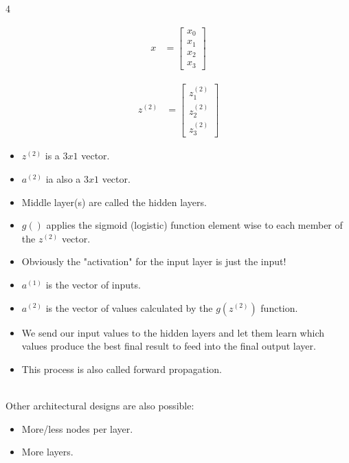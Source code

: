 \documentclass{article}
\begin{document}
\begin{multicols}{4}

  \begin{align*}
    x & = \begin{bmatrix}
      x_{0} \\
      x_{1} \\
      x_2   \\
      x_3
    \end{bmatrix}
  \end{align*}

  \columnbreak

  \begin{align*}
    z^{(2)} & = \begin{bmatrix}
      z^{(2)}_1 \\
      z^{(2)}_2 \\
      z^{(2)}_3
    \end{bmatrix}
  \end{align*}
  \columnbreak
  \columnbreak
\end{multicols}


\begin{itemize}
  \item $z^{(2)}$ is a $3x1$ vector.
  \item $a^{(2)}$ ia also a $3x1$ vector.
  \item Middle layer(s) are called the hidden layers.
  \item $g()$ applies the sigmoid (logistic) function element wise to each member of the $z^{(2)}$ vector.
  \item Obviously the "activation" for the input layer is just the input!
  \item $a^{(1)}$ is the vector of inputs.
  \item $a^{(2)}$ is the vector of values calculated by the $g(z^{(2)})$ function.
  \item We send our input values to the hidden layers and let them learn which values produce the best final result to feed into the final output layer.
  \item This process is also called forward propagation.
\end{itemize}

~\\
Other architectural designs are also possible:\\
\begin{itemize}
  \item More/less nodes per layer.
  \item More layers.
\end{itemize}
\end{document}
